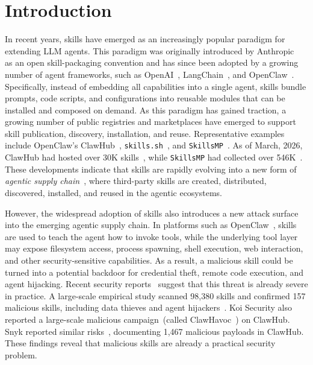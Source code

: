 \section{Introduction}
In recent years, skills have emerged as an increasingly popular paradigm for extending LLM agents. This paradigm was originally introduced by Anthropic~\cite{agentskills-overview} as an open skill-packaging convention and has since been adopted by a growing number of agent frameworks, such as OpenAI~\cite{openai-codex-skills}, LangChain~\cite{langchain-deepagents-skills}, and OpenClaw~\cite{openclaw-skills-docs}. Specifically, instead of embedding all capabilities into a single agent, skills bundle prompts, code scripts, and configurations into reusable modules that can be installed and composed on demand.
As this paradigm has gained traction, a growing number of public registries and marketplaces have emerged to support skill publication, discovery, installation, and reuse. Representative examples include OpenClaw’s ClawHub~\cite{clawhub}, \texttt{skills.sh}~\cite{skills.sh}, and \texttt{SkillsMP}~\cite{skillsmp}. As of March, 2026, ClawHub had hosted over 30K skills~\cite{clawhub}, while \texttt{SkillsMP} had collected over 546K~\cite{skillsmp}. These developments indicate that skills are rapidly evolving into a new form of \emph{agentic supply chain}~\cite{hu2025llmsc,wang2025llmsc,huang2025llmsc}, where third-party skills are created, distributed, discovered, installed, and reused in the agentic ecosystems.

However, the widespread adoption of skills also introduces a new attack surface into the emerging agentic supply chain. In platforms such as OpenClaw~\cite{openclaw-skills-docs}, skills are used to teach the agent how to invoke tools, while the underlying tool layer may expose filesystem access, process spawning, shell execution, web interaction, and other security-sensitive capabilities. As a result, a malicious skill could be turned into a potential backdoor for credential theft, remote code execution, and agent hijacking.
Recent security reports~\cite{koi2026clawhavoc,snyk2026skills,opensourcemalware-clawdbot-crypto} suggest that this threat is already severe in practice.
A large-scale empirical study scanned 98,380 skills and confirmed 157 malicious skills, including data thieves and agent hijackers~\cite{liu2026maliciousagentskillswild}. Koi Security also reported a large-scale malicious campaign~(called ClawHavoc~\cite{koi2026clawhavoc}) on ClawHub. Snyk reported similar risks~\cite{snyk2026skills}, documenting 1,467 malicious payloads in ClawHub. These findings reveal that malicious skills are already a practical security problem. 

